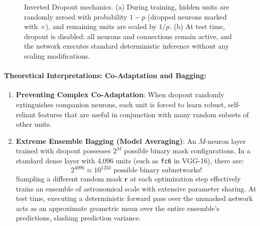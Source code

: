 \begin{figure}[H]
\caption{Inverted Dropout mechanics. (a) During training, hidden units are randomly zeroed with probability $1-p$ (dropped neurons marked with $\times$), and remaining units are scaled by $1/p$. (b) At test time, dropout is disabled: all neurons and connections remain active, and the network executes standard deterministic inference without any scaling modifications.}
\label{fig:inverted_dropout_diagram}
\end{figure}

\paragraph{Theoretical Interpretations: Co-Adaptation and Bagging:}
\begin{enumerate}[leftmargin=*]
  \item \textbf{Preventing Complex Co-Adaptation}: When dropout randomly extinguishes companion neurons, each unit is forced to learn robust, self-reliant features that are useful in conjunction with many random subsets of other units.
  \item \textbf{Extreme Ensemble Bagging (Model Averaging)}: An $M$-neuron layer trained with dropout possesses $2^M$ possible binary mask configurations. In a standard dense layer with 4,096 units (such as \texttt{fc6} in VGG-16), there are:
    \begin{equation}
    2^{4096} \approx 10^{1233} \text{ possible binary subnetworks!}
    \end{equation}
    Sampling a different random mask $\mathbf{r}$ at each optimization step effectively trains an ensemble of astronomical scale with extensive parameter sharing. At test time, executing a deterministic forward pass over the unmasked network acts as an approximate geometric mean over the entire ensemble's predictions, slashing prediction variance.
\end{enumerate}


